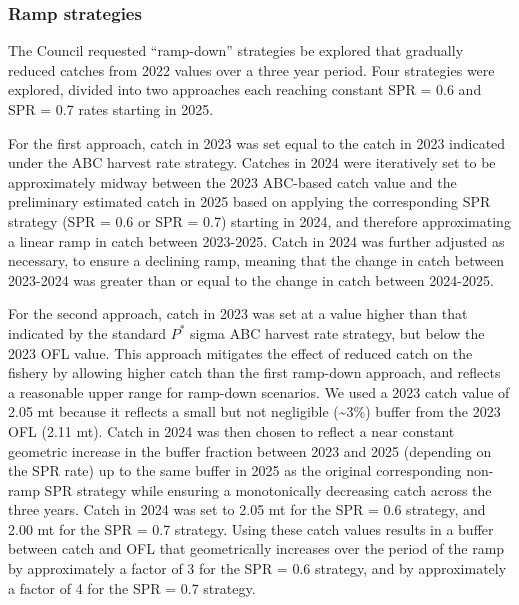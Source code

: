 \documentclass[11pt,
  english,
  letterpaper,
]{article}
\begin{document}

\hypertarget{ramp-strategies}{%
\subsubsection{Ramp strategies}\label{ramp-strategies}}

\leavevmode\tagmcend\tagstructend


The Council requested ``ramp-down'' strategies be explored that gradually reduced catches from 2022 values over a three year period. Four strategies were explored, divided into two approaches each reaching constant SPR = 0.6 and SPR = 0.7 rates starting in 2025.

\leavevmode\tagmcend\tagstructend\par


For the first approach, catch in 2023 was set equal to the catch in 2023 indicated under the ABC harvest rate strategy. Catches in 2024 were iteratively set to be approximately midway between the 2023 ABC-based catch value and the preliminary estimated catch in 2025 based on applying the corresponding SPR strategy (SPR = 0.6 or SPR = 0.7) starting in 2024, and therefore approximating a linear ramp in catch between 2023-2025. Catch in 2024 was further adjusted as necessary, to ensure a declining ramp, meaning that the change in catch between 2023-2024 was greater than or equal to the change in catch between 2024-2025.

\leavevmode\tagmcend\tagstructend\par


For the second approach, catch in 2023 was set at a value higher than that indicated by the standard {\(P^*\)\leavevmode\tagmcend\tagstructend} sigma ABC harvest rate strategy, but below the 2023 OFL value. This approach mitigates the effect of reduced catch on the fishery by allowing higher catch than the first ramp-down approach, and reflects a reasonable upper range for ramp-down scenarios. We used a 2023 catch value of 2.05 mt because it reflects a small but not negligible (\textasciitilde3{\(\%\)\leavevmode\tagmcend\tagstructend}) buffer from the 2023 OFL (2.11 mt). Catch in 2024 was then chosen to reflect a near constant geometric increase in the buffer fraction between 2023 and 2025 (depending on the SPR rate) up to the same buffer in 2025 as the original corresponding non-ramp SPR strategy while ensuring a monotonically decreasing catch across the three years. Catch in 2024 was set to 2.05 mt for the SPR = 0.6 strategy, and 2.00 mt for the SPR = 0.7 strategy. Using these catch values results in a buffer between catch and OFL that geometrically increases over the period of the ramp by approximately a factor of 3 for the SPR = 0.6 strategy, and by approximately a factor of 4 for the SPR = 0.7 strategy.
\end{document}
